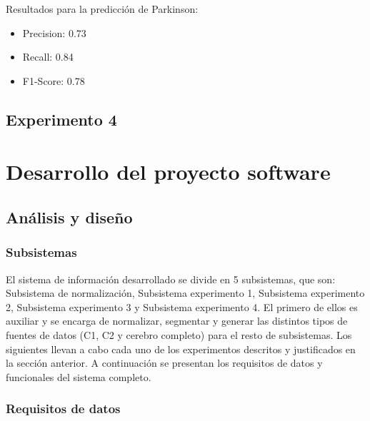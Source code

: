 Resultados para la predicción de Parkinson:

\begin{itemize}
	\item Precision: 0.73
	\item Recall: 0.84
	\item F1-Score: 0.78
\end{itemize}

 \newpage
\subsection{Experimento 4}

\newpage

\section{Desarrollo del proyecto software}

\subsection{Análisis y diseño}

\subsubsection{Subsistemas}

El sistema de información desarrollado se divide en 5 subsistemas, que son: Subsistema de normalización, Subsistema experimento 1, Subsistema experimento 2, Subsistema experimento 3 y Subsistema experimento 4. El primero de ellos es auxiliar y se encarga de normalizar, segmentar y generar las distintos tipos de fuentes de datos (C1, C2 y cerebro completo) para el resto de subsistemas. Los siguientes llevan a cabo cada uno de los experimentos descritos y justificados en la sección anterior. A continuación se presentan los requisitos de datos y funcionales del sistema completo.

\subsubsection{Requisitos de datos}

